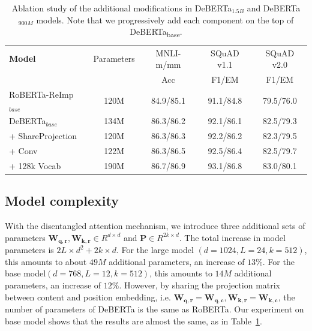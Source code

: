 \begin{table}[htb!]
    \centering
    \begin{tabular}{@{\hskip1pt}l|c| c| c| c}
    \toprule
        \bf Model&Parameters &{MNLI-m/mm}& {SQuAD v1.1} &{SQuAD v2.0} \\ 
          &\ &  Acc& F1/EM & F1/EM  \\ \hline
        
        RoBERTa-ReImp$_{base}$ & 120M & 84.9/85.1 & 91.1/84.8 &79.5/76.0  \\ 
        \hline
        DeBERTa$_{base}$ & 134M& 86.3/86.2 &92.1/86.1 & 82.5/79.3  \\
        + ShareProjection & 120M & 86.3/86.3 &92.2/86.2 & 82.3/79.5  \\
        + Conv & 122M & 86.3/86.5 &92.5/86.4 & 82.5/79.7  \\
        + 128k Vocab & 190M & 86.7/86.9 &93.1/86.8 & 83.0/80.1  \\
       \bottomrule
        \end{tabular}
    \caption{
    Ablation study of the additional modifications in DeBERTa$_{1.5B}$ and DeBERTa$_{900M}$ models. Note that we progressively add each component on the top of DeBERTa\textsubscript{base}. 
    }
    \label{tab:v2}
\end{table}

\subsection{Model complexity}
With the disentangled attention mechanism, we introduce three additional sets of parameters $\bm{W_{q,r}},\bm{W_{k,r}} \in R^{d \times d}$ and $\bm{P} \in R^{2k \times d}$. The total increase in model parameters is $2L\times d^2 + 2k\times d$. For the large model $(d=1024,L=24,k=512)$, this amounts to about $49M$ additional parameters, an increase of $13\%$. 
For the base model$(d=768,L=12,k=512)$, this amounts to $14M$ additional parameters, an increase of $12\%$. 
However, by sharing the projection matrix between content and position embedding, i.e.  $\bm{W_{q,r}}=\bm{W_{q,c}},\bm{W_{k,r}}=\bm{W_{k,c}}$, the number of parameters of DeBERTa is the same as RoBERTa. 
Our experiment on base model shows that the results are almost the same, as in Table~\ref{tab:v2}. 



